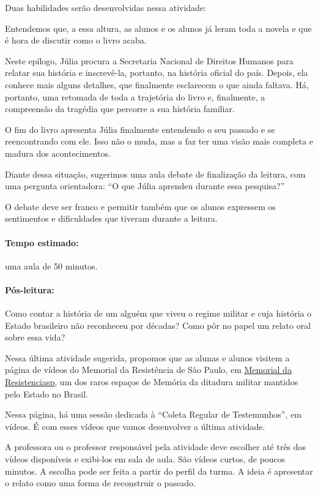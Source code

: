 \documentclass[12pt]{extarticle}
\begin{document}
Duas habilidades serão desenvolvidas nessa atividade:

Entendemos que, a essa altura, as alunos e os alunos já leram toda a
novela e que é hora de discutir como o livro acaba.

Neste epílogo, Júlia procura a Secretaria Nacional de Direitos Humanos
para relatar sua história e inscrevê-la, portanto, na história oficial
do país. Depois, ela conhece mais alguns detalhes, que finalmente
esclarecem o que ainda faltava. Há, portanto, uma retomada de toda a
trajetória do livro e, finalmente, a compreensão da tragédia que
percorre a sua história familiar.

O fim do livro apresenta Júlia finalmente entendendo o seu passado e se
reencontrando com ele. Isso não o muda, mas a faz ter uma visão mais
completa e madura dos acontecimentos.

Diante dessa situação, sugerimos uma aula debate de finalização da
leitura, com uma pergunta orientadora: ``O que Júlia aprendeu durante
essa pesquisa?''

O debate deve ser franco e permitir também que os alunos expressem os
sentimentos e dificuldades que tiveram durante a leitura.

\paragraph{Tempo estimado:} uma aula de 50 minutos.

\paragraph{Pós-leitura:}

Como contar a história de um alguém que viveu o regime militar e cuja
história o Estado brasileiro não reconheceu por décadas? Como pôr no papel um relato oral sobre essa vida?

Nessa última atividade sugerida, propomos que as alunas e alunos visitem
a página de vídeos do Memorial da Resistência de São Paulo, em
\href{http://memorialdaresistenciasp.org.br/acervo/}{Memorial da Resistenciasp}, um dos raros espaços de
Memória da ditadura militar mantidos pelo Estado no Brasil.



Nessa página, há uma sessão dedicada à ``Coleta Regular de
Testemunhos'', em vídeos. É com esses vídeos que vamos desenvolver a
última atividade.

A professora ou o professor responsável pela atividade deve escolher até
três dos vídeos disponíveis e exibi-los em sala de aula. São vídeos
curtos, de poucos minutos. A escolha pode ser feita a partir do perfil
da turma. A ideia é apresentar o relato como uma forma de
reconstruir o passado.
\end{document}
